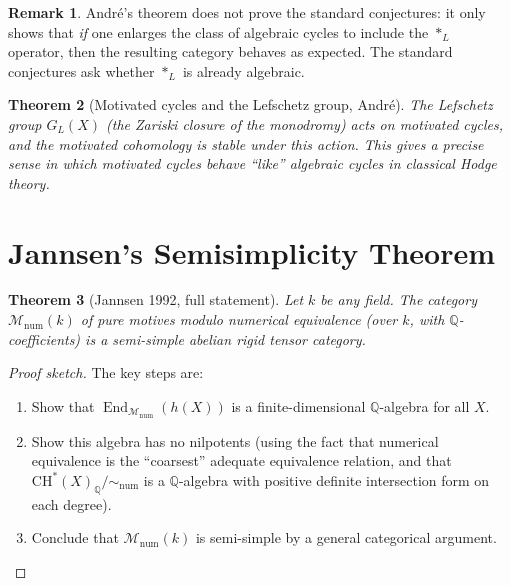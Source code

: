 \documentclass[12pt,a4paper]{amsart}
\newtheorem{theorem}{Theorem}[section]
\theoremstyle{definition}
\newtheorem{remark}[theorem]{Remark}
\newcommand{\Q}{\mathbb{Q}}
\DeclareMathOperator{\End}{End}
\newcommand{\CH}{\mathrm{CH}}
\begin{document}
\begin{remark}
Andr\'e's theorem does not prove the standard conjectures: it only shows that
\emph{if} one enlarges the class of algebraic cycles to include the $*_L$
operator, then the resulting category behaves as expected.  The standard
conjectures ask whether $*_L$ is already algebraic.
\end{remark}

\begin{theorem}[Motivated cycles and the Lefschetz group, Andr\'{e}]
The Lefschetz group $G_L(X)$ (the Zariski closure of the monodromy) acts on
motivated cycles, and the motivated cohomology is stable under this action.
This gives a precise sense in which motivated cycles behave ``like''
algebraic cycles in classical Hodge theory.
\end{theorem}

\section{Jannsen's Semisimplicity Theorem}\label{sec:jannsen}

\begin{theorem}[Jannsen 1992, full statement]\label{thm:jannsen_full}
Let $k$ be any field.  The category $\mathcal{M}_{\mathrm{num}}(k)$ of pure
motives modulo numerical equivalence (over $k$, with $\Q$-coefficients) is a
semi-simple abelian rigid tensor category.
\end{theorem}

\begin{proof}[Proof sketch]
The key steps are:
\begin{enumerate}[label=(\arabic*)]
  \item Show that $\End_{\mathcal{M}_{\mathrm{num}}}(h(X))$ is a
        finite-dimensional $\Q$-algebra for all $X$.
  \item Show this algebra has no nilpotents (using the fact that numerical
        equivalence is the ``coarsest'' adequate equivalence relation, and
        that $\CH^*(X)_\Q/{\sim_{\mathrm{num}}}$ is a $\Q$-algebra with positive
        definite intersection form on each degree).
  \item Conclude that $\mathcal{M}_{\mathrm{num}}(k)$ is semi-simple by a
        general categorical argument.
\end{enumerate}
\end{proof}
\end{document}
